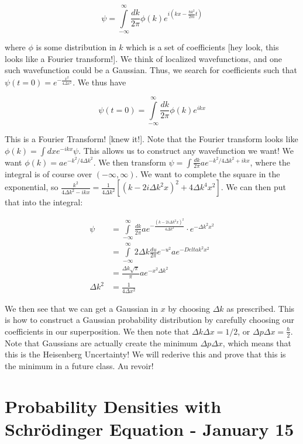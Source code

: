 \documentclass{report}
\begin{document}
$$\psi = \displaystyle\int\limits_{-\infty}^\infty \frac{dk}{2\pi}\phi(k)e^{i(kx - \frac{\hbar k^2}{2m}t)}$$

where $\phi$ is some distribution in $k$ which is a set of coefficients [hey look, this looks like a Fourier transform!]. We think of localized wavefunctions, and one such wavefunction could be a Gaussian. Thus, we search for coefficients such that $\psi(t=0) = e^{-\frac{x^2}{4\Delta x^2}}$. We thus have 

$$\psi(t=0) = \displaystyle\int\limits_{-\infty}^\infty \frac{dk}{2\pi}\phi(k)e^{ikx}$$

This is a Fourier Transform! [knew it!]. Note that the Fourier transform looks like $\phi(k) = \int dxe^{-ikx}\psi$. This allows us to construct any wavefunction we want! We want $\phi(k) = ae^{-k^2/4\Delta k^2}$. We then transform $\psi = \int \frac{dk}{2\pi} ae^{-k^2/4\Delta k^2 + ikx}$, where the integral is of course over $(-\infty, \infty)$. We want to complete the square in the exponential, so $\frac{k^2}{4\Delta k^2 - ikx} = \frac{1}{4\Delta k^2}\left[(k - 2i\Delta k^2x)^2 + 4\Delta k^4x^2\right]$. We can then put that into the integral:

\begin{align*}
\psi &= \displaystyle\int\limits_{-\infty}^\infty \frac{dk}{2\pi}ae^{-\frac{\left(k - 2i\Delta k^2x\right)^2}{4\Delta k^2}}\cdot e^{-\Delta k^2 x^2}\\
&= \displaystyle\int\limits_{-\infty}^\infty 2\Delta k \frac{du}{2\pi} e^{-u^2}ae^{-Delta k^2x^2}\\
&= \frac{\Delta k\sqrt{\pi}}{\pi}ae^{-x^2\Delta k^2}\\
\Delta k^2 &= \frac{1}{4\Delta x^2}
\end{align*}

We then see that we can get a Gaussian in $x$ by choosing $\Delta k$ as prescribed. This is how to construct a Gaussian probability distribution by carefully choosing our coefficients in our superposition. We then note that $\Delta k \Delta x = 1/2$, or $\Delta p \Delta x = \frac{\hbar}{2}$. Note that Gaussians are actually create the minimum $\Delta p \Delta x$, which means that this is the Heisenberg Uncertainty! We will rederive this and prove that this is the minimum in a future class. Au revoir!

\chapter{Probability Densities with Schr\"odinger Equation - January 15}
\end{document}
